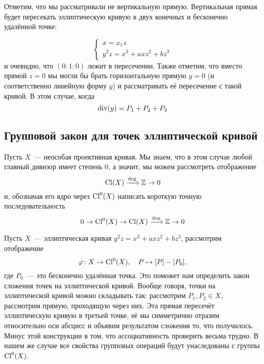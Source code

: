   	Отметим, что мы рассматривали не вертикальную прямую. Вертикальная прямая будет пересекать эллиптическую кривую в двух конечных и бесконечно удалённой точке: 

  	\[
  		\begin{cases}
  			x = x_1 z \\ y^2 z = x^3 + a x z^2 + b z^3
  		\end{cases}
  	\]
  	и очевидно, что $(0 : 1 : 0)$ лежит в пересечении. Также отметим, что вместо  прямой $z = 0$ мы могли бы брать горизонтальную прямую $y = 0$ (и соответственно линейную форму $y$) и рассматривать её пересечение с такой кривой. В этом случае, когда  
  	\[
  		\operatorname{div}(y) = P_1 + P_2 + P_3
  	\]

   \subsection{Групповой закон для точек эллиптической кривой}

  	Пусть $X$~--- неособая проективная кривая. Мы знаем, что в этом случае любой главный дивизор имеет степень 0, а значит, мы можем рассмотреть отображение 
  	\[
  		\operatorname{Cl}(X) \xrightarrow{\deg} \mathbb{Z} \to 0
  	\]
  	и, обозначая его ядро через $\operatorname{Cl}^0(X)$ написать короткую точную последовательность 
  	\[
  		0 \to \operatorname{Cl}^0(X) \to \operatorname{Cl}(X) \xrightarrow{\deg} \mathbb{Z} \to 0
  	\]

  	Пусть $X$~--- эллиптическая кривая $y^2 z = x^3 + ax z^2 + bz^3$, рассмотрим отображение 
  	\[
  		\varphi\colon X \to \operatorname{Cl}^0(X), \quad P \mapsto [P] - [P_0],
  	\]
  	где $P_0$~--- это бесконечно удалённая точка. Это поможет нам определить закон сложения точек на эллиптической кривой. Вообще говоря, точки на эллиптической кривой можно складывать так: рассмотрим $P_1, P_2 \in X$, рассмотрим прямую, проходящую через них. Эта прямая пересечёт эллиптическую кривую в третьей точке, её мы симметрично отразим относительно оси абсцисс и объявим результатом сложения то, что получилось. Минус этой конструкции в том, что ассоциативность проверить весьма трудно. В нашем же случае все свойства групповых операций будут унаследованы с группы $\operatorname{Cl}^0(X)$.  

